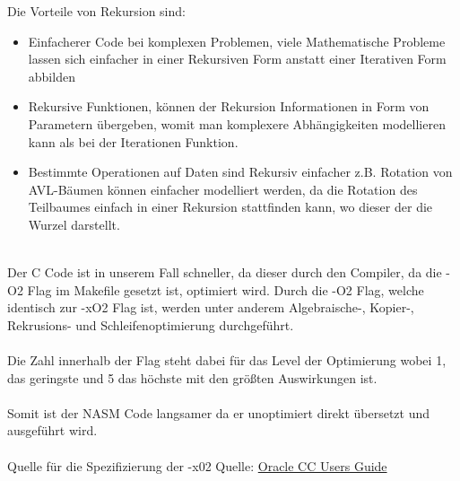 \documentclass[11pt]{article}
\begin{document}
Die Vorteile von Rekursion sind:
\begin{itemize}
    \item Einfacherer Code bei komplexen Problemen, viele Mathematische Probleme lassen sich einfacher in einer Rekursiven Form anstatt einer Iterativen Form abbilden
    \item Rekursive Funktionen, können der Rekursion Informationen in Form von Parametern übergeben, womit man komplexere Abhängigkeiten modellieren kann als bei der Iterationen Funktion.
    \item Bestimmte Operationen auf Daten sind Rekursiv einfacher z.B. Rotation von AVL-Bäumen können einfacher modelliert werden, da die Rotation des Teilbaumes einfach in einer Rekursion stattfinden kann, wo dieser der die Wurzel darstellt.
\end{itemize}
\\
Der C Code ist in unserem Fall schneller, da dieser durch den Compiler, da die -O2 Flag im Makefile gesetzt ist, optimiert wird. Durch die -O2 Flag, welche identisch zur -xO2 Flag ist, werden unter anderem Algebraische-, Kopier-, Rekrusions- und Schleifenoptimierung durchgeführt.
\\
\\
Die Zahl innerhalb der Flag steht dabei für das Level der Optimierung wobei 1, das geringste und 5 das höchste mit den größten Auswirkungen ist.
\\
\\
Somit ist der NASM Code langsamer da er unoptimiert direkt übersetzt und ausgeführt wird.
\\
\\
Quelle für die Spezifizierung der -x02 Quelle: \href{https://docs.oracle.com/cd/E19957-01/806-3567/cc_options.html}{Oracle CC Users Guide}
\end{document}
